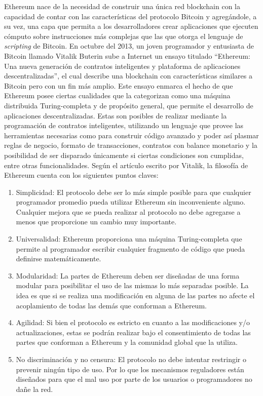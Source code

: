 Ethereum nace de la necesidad de construir una única red blockchain con la capacidad de contar con las características del protocolo Bitcoin y agregándole, a su vez, una capa que permita a los desarrolladores crear aplicaciones que ejecuten cómputo sobre instrucciones más complejas que las que otorga el lenguaje de \textit{scripting} de Bitcoin. En octubre del 2013, un joven programador y entusiasta de Bitcoin llamado Vitalik Buterin sube a Internet un ensayo titulado ``Ethereum: Una nueva generación de contratos inteligentes y plataforma de aplicaciones descentralizadas''\cite{Buterin2014}, el cual describe una blockchain con características similares a Bitcoin pero con un fin más amplio. Este ensayo enmarca el hecho de que Ethereum posee ciertas cualidades que la categorizan como una máquina distribuida Turing-completa y de propósito general, que permite el desarrollo de aplicaciones descentralizadas. Estas son posibles de realizar mediante la programación de contratos inteligentes, utilizando un lenguaje que provee las herramientas necesarias como para construir código avanzado y poder así plasmar reglas de negocio, formato de transacciones, contratos con balance monetario y la posibilidad de ser disparado únicamente si ciertas condiciones son cumplidas, entre otras funcionalidades. Según el artículo escrito por Vitalik, la filosofía de Ethereum cuenta con los siguientes puntos claves:

\begin{enumerate}
  \item Simplicidad: El protocolo debe ser lo más simple posible para que cualquier programador promedio pueda utilizar Ethereum sin inconveniente alguno. Cualquier mejora que se pueda realizar al protocolo no debe agregarse a menos que proporcione un cambio muy importante.
  \item Universalidad: Ethereum proporciona una máquina Turing-completa que permite al programador escribir cualquier fragmento de código que pueda definirse matemáticamente.
  \item Modularidad: La partes de Ethereum deben ser diseñadas de una forma modular para posibilitar el uso de las mismas lo más separadas posible. La idea es que si se realiza una modificación en alguna de las partes no afecte el acoplamiento de todas las demás que conforman a Ethereum.
  \item Agilidad: Si bien el protocolo es estricto en cuanto a las modificaciones y/o actualizaciones, estas se podrán realizar bajo el consentimiento de todas las partes que conforman a Ethereum y la comunidad global que la utiliza.
  \item No discriminación y no censura: El protocolo no debe intentar restringir o prevenir ningún tipo de uso. Por lo que los mecanismos reguladores están diseñados para que el mal uso por parte de los usuarios o programadores no dañe la red.
\end{enumerate}

